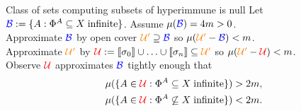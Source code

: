 \begin{frame}{Class of sets computing subsets of hyperimmune is null}
  Let $\textcolor{blue}{\mathcal{B}} :=\{A: \Phi^A \subseteq X\;
  \text{infinite}\}$. Assume $\mu(\textcolor{blue}{\mathcal{B}})=4m>0$.\\
  Approximate $\textcolor{blue}{\mathcal{B}}$ by open cover
  $\textcolor{orange}{\mathcal{U}'} \supseteq\textcolor{blue}{\mathcal{B}}$
  so $\mu(\textcolor{orange}{\mathcal{U}'}
  -\textcolor{blue}{\mathcal{B}})<m$.\\
  Approximate $\textcolor{orange}{\mathcal{U}'}$ by
  $\textcolor{red}{\mathcal{U}} :=\llbracket\sigma_0\rrbracket \cup
  \ldots\cup\llbracket\sigma_n\rrbracket
  \subseteq\textcolor{orange}{\mathcal{U}'}$ so
  $\mu(\textcolor{orange}{\mathcal{U}'} -\textcolor{red}{\mathcal{U}})
  <m$.\\

  Observe $\textcolor{red}{\mathcal{U}}$ approximates
  $\textcolor{blue}{\mathcal{B}}$
  tightly enough that
  \begin{align*}
    \mu(\{A\in\textcolor{red}{\mathcal{U}}: \Phi^A \subseteq X\;
    \text{infinite}\}) &>2m,\\
    \mu(\{A\in\textcolor{red}{\mathcal{U}}: \Phi^A \not\subseteq X\;
    \text{infinite}\}) &<2m.
  \end{align*}

  \begin{center}
  \end{center}
\end{frame}

